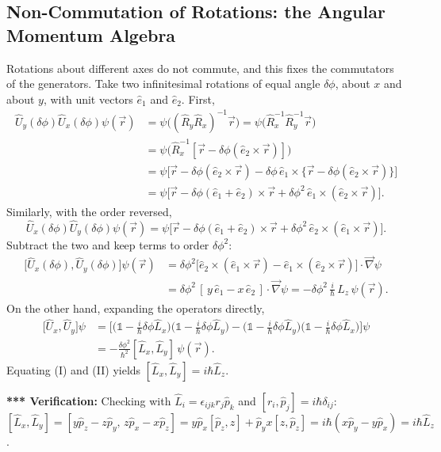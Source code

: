 \documentclass[11pt,a4paper]{article}
\begin{document}
\subsection{Non-Commutation of Rotations: the Angular Momentum Algebra}
Rotations about different axes do not commute, and this fixes the commutators of the generators. Take two infinitesimal rotations of equal angle $\delta\phi$, about $x$ and about $y$, with unit vectors $\hat e_1$ and $\hat e_2$. First,
\begin{align*}
\hat U_y(\delta\phi)\hat U_x(\delta\phi)\psi(\vec r)&=\psi\big((\hat R_y\hat R_x)^{-1}\vec r\big)=\psi\big(\hat R_x^{-1}\hat R_y^{-1}\vec r\big)\\
&=\psi\big(\hat R_x^{-1}[\vec r-\delta\phi(\hat e_2\times\vec r)]\big)\\
&=\psi\Big[\vec r-\delta\phi(\hat e_2\times\vec r)-\delta\phi\,\hat e_1\times\{\vec r-\delta\phi(\hat e_2\times\vec r)\}\Big]\\
&=\psi\Big[\vec r-\delta\phi(\hat e_1+\hat e_2)\times\vec r+\delta\phi^2\,\hat e_1\times(\hat e_2\times\vec r)\Big].
\end{align*}
Similarly, with the order reversed,
\[
\hat U_x(\delta\phi)\hat U_y(\delta\phi)\psi(\vec r)=\psi\Big[\vec r-\delta\phi(\hat e_1+\hat e_2)\times\vec r+\delta\phi^2\,\hat e_2\times(\hat e_1\times\vec r)\Big].
\]
Subtract the two and keep terms to order $\delta\phi^2$:
\begin{align*}
\big[\hat U_x(\delta\phi),\hat U_y(\delta\phi)\big]\psi(\vec r)&=\delta\phi^2\big[\hat e_2\times(\hat e_1\times\vec r)-\hat e_1\times(\hat e_2\times\vec r)\big]\cdot\vec\nabla\psi\\
&=\delta\phi^2\,[\,y\,\hat e_1-x\,\hat e_2\,]\cdot\vec\nabla\psi=-\delta\phi^2\,\frac i\hbar\,\hat L_z\,\psi(\vec r).\tag{I}
\end{align*}
On the other hand, expanding the operators directly,
\begin{align*}
\big[\hat U_x,\hat U_y\big]\psi&=\Big[\Big(\mathbb 1-\tfrac i\hbar\delta\phi\hat L_x\Big)\Big(\mathbb 1-\tfrac i\hbar\delta\phi\hat L_y\Big)-\Big(\mathbb 1-\tfrac i\hbar\delta\phi\hat L_y\Big)\Big(\mathbb 1-\tfrac i\hbar\delta\phi\hat L_x\Big)\Big]\psi\\
&=-\frac{\delta\phi^2}{\hbar^2}[\hat L_x,\hat L_y]\,\psi(\vec r).\tag{II}
\end{align*}
Equating (I) and (II) yields $[\hat L_x,\hat L_y]=i\hbar\hat L_z$.

\textbf{*** Verification:} Checking with $\hat L_i=\epsilon_{ijk}r_j\hat p_k$ and $[r_i,\hat p_j]=i\hbar\delta_{ij}$: $[\hat L_x,\hat L_y]=[y\hat p_z-z\hat p_y,\,z\hat p_x-x\hat p_z]=y\hat p_x[\hat p_z,z]+\hat p_yx[z,\hat p_z]=i\hbar(x\hat p_y-y\hat p_x)=i\hbar\hat L_z$.
\end{document}
